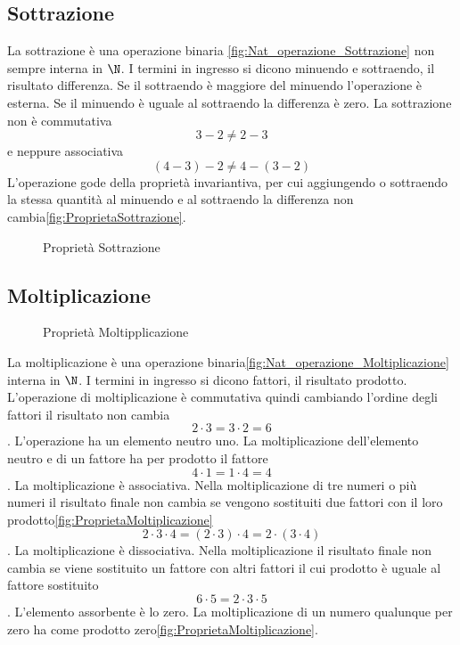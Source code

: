 \subsection{Sottrazione}
La sottrazione è una operazione binaria \nobs\vref{fig:Nat_operazione_Sottrazione} non sempre interna in $\N$. I termini in ingresso si dicono minuendo e sottraendo, il risultato differenza. Se il sottraendo è maggiore del minuendo l'operazione è esterna. Se il minuendo è uguale al sottraendo la differenza è zero. La sottrazione non è commutativa \[3-2\neq2-3\] e neppure associativa \[(4-3)-2\neq4-(3-2)\]
 L'operazione gode della proprietà invariantiva, per cui aggiungendo o sottraendo la stessa quantità al minuendo e al sottraendo la differenza non cambia\nobs\vref{fig:ProprietaSottrazione}.  
\label{sec:NumerinatDiff}
\begin{figure} %
	\centering

	\caption{Proprietà Sottrazione}
	\label{fig:ProprietaSottrazione}\end{figure}
\subsection{Moltiplicazione}
\label{sec:NumerinatMolt}
\begin{figure} %
	\centering

	\caption{Proprietà Moltipplicazione}
	\label{fig:ProprietaMoltiplicazione}\end{figure}
La moltiplicazione è una operazione binaria\nobs\vref{fig:Nat_operazione_Moltiplicazione}  interna in $\N$. I termini in ingresso si dicono fattori, il risultato prodotto. L'operazione di moltiplicazione  è commutativa quindi cambiando l'ordine degli fattori il risultato non cambia \[2\cdot3=3\cdot2=6\]. L'operazione ha un elemento neutro uno. La moltiplicazione dell'elemento neutro e di un fattore ha per prodotto il fattore  \[4\cdot1=1\cdot4=4\]. La moltiplicazione è associativa. Nella moltiplicazione di tre numeri o più numeri il risultato finale non cambia se vengono sostituiti due fattori con il loro prodotto\nobs\vref{fig:ProprietaMoltiplicazione} \[2\cdot3\cdot4=(2\cdot3)\cdot4=2\cdot(3\cdot4)\]. La moltiplicazione è dissociativa. Nella moltiplicazione  il risultato finale non cambia se viene sostituito un fattore con altri fattori il cui prodotto è uguale al fattore sostituito  \[6\cdot5=2\cdot3\cdot5\]. L'elemento assorbente è lo zero. La moltiplicazione di un numero qualunque per zero ha come prodotto zero\nobs\vref{fig:ProprietaMoltiplicazione}.
